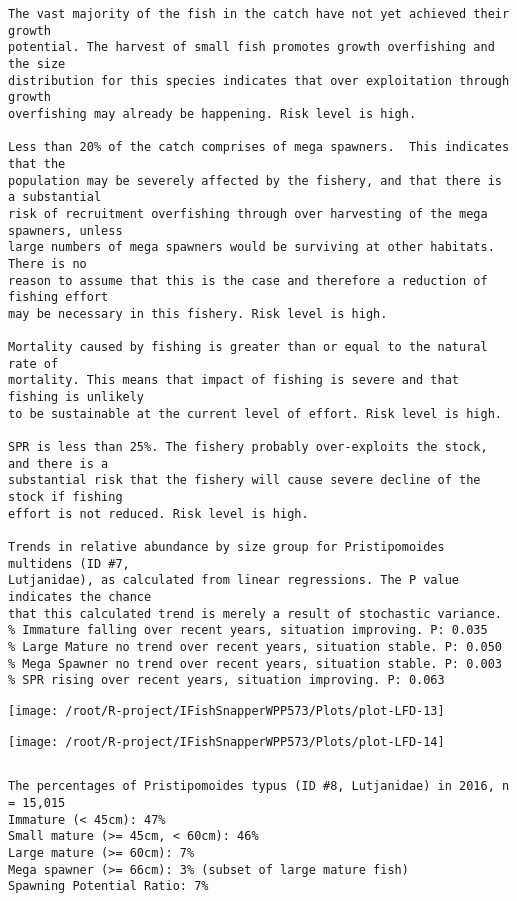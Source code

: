 \documentclass{report}\usepackage[]{graphicx}\usepackage[]{color}
\makeatletter
\def\maxwidth{ %
  \ifdim\Gin@nat@width>\linewidth
    \linewidth
  \else
    \Gin@nat@width
  \fi
}
\newenvironment{kframe}{%
 \def\at@end@of@kframe{}%
 \ifinner\ifhmode%
  \def\at@end@of@kframe{\end{minipage}}%
  \begin{minipage}{\columnwidth}%
 \fi\fi%
 \def\FrameCommand##1{\hskip\@totalleftmargin \hskip-\fboxsep
 \colorbox{shadecolor}{##1}\hskip-\fboxsep
     \hskip-\linewidth \hskip-\@totalleftmargin \hskip\columnwidth}%
 \MakeFramed {\advance\hsize-\width
   \@totalleftmargin\z@ \linewidth\hsize
   \@setminipage}}%
 {\par\unskip\endMakeFramed%
 \at@end@of@kframe}
\newenvironment{knitrout}{}{} %
\makeatother
\begin{document}
\begin{knitrout}
\begin{kframe}
\begin{verbatim}
The vast majority of the fish in the catch have not yet achieved their growth
potential. The harvest of small fish promotes growth overfishing and the size
distribution for this species indicates that over exploitation through growth
overfishing may already be happening. Risk level is high.

Less than 20% of the catch comprises of mega spawners.  This indicates that the
population may be severely affected by the fishery, and that there is a substantial
risk of recruitment overfishing through over harvesting of the mega spawners, unless
large numbers of mega spawners would be surviving at other habitats. There is no
reason to assume that this is the case and therefore a reduction of fishing effort
may be necessary in this fishery. Risk level is high.
 
Mortality caused by fishing is greater than or equal to the natural rate of
mortality. This means that impact of fishing is severe and that fishing is unlikely
to be sustainable at the current level of effort. Risk level is high.
 
SPR is less than 25%. The fishery probably over-exploits the stock, and there is a
substantial risk that the fishery will cause severe decline of the stock if fishing
effort is not reduced. Risk level is high.
 
Trends in relative abundance by size group for Pristipomoides multidens (ID #7,
Lutjanidae), as calculated from linear regressions. The P value indicates the chance
that this calculated trend is merely a result of stochastic variance.
% Immature falling over recent years, situation improving. P: 0.035
% Large Mature no trend over recent years, situation stable. P: 0.050
% Mega Spawner no trend over recent years, situation stable. P: 0.003
% SPR rising over recent years, situation improving. P: 0.063
\end{verbatim}
\end{kframe}
\texttt{[image: /root/R-project/IFishSnapperWPP573/Plots/plot-LFD-13]} 

\texttt{[image: /root/R-project/IFishSnapperWPP573/Plots/plot-LFD-14]} 
\begin{kframe}\begin{verbatim}
\end{verbatim}
\end{kframe}
\clearpage
\newpage
\begin{kframe}\begin{verbatim}The percentages of Pristipomoides typus (ID #8, Lutjanidae) in 2016, n = 15,015
Immature (< 45cm): 47%
Small mature (>= 45cm, < 60cm): 46%
Large mature (>= 60cm): 7%
Mega spawner (>= 66cm): 3% (subset of large mature fish)
Spawning Potential Ratio: 7%
 

\end{verbatim}
\end{kframe}
\end{knitrout}
\end{document}
